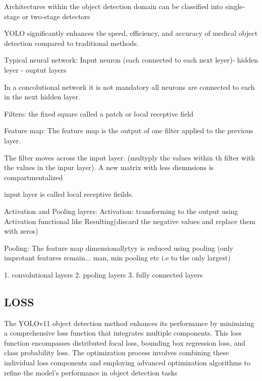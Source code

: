 \documentclass[a4paper,10pt,twocolumn]{article}
\numberwithin{figure}{section}
\numberwithin{table}{section}
\begin{document}
Architectures within the object detection domain can be 
classified into single-stage or two-stage detectors

YOLO significantly enhances the speed, efficiency, and accuracy of medical object detection compared to traditional methods.

Typical neural network:
Input neuron (each connected to each next leyer)- hidden leyer - ouptut layers

In a concolutional network it is not mandatory all neurons are connected
to each in the next hidden layer. 

Filters: the fixed square called a patch or local receptive field

Feature map: The feature map is the output of one filter applied 
to the previous layer. 

The filter moves across the input layer. (multyply the values within th 
filter with the values in the inpur layer). A new matrix with less diemnsions is compartmentalized

input layer is called local receptive fieilds. 


Activation and Pooling layers:
Activation: transforming to the output using Activation functional like Resulting(discard the negative
values and replace them with zeros) 

Pooling: The feature map dimensionallytyy is reduced using pooling 
(only improtant features remain... man, min pooling etc i.e  to the only largest)

1. convolutional layers 
2. ppoling layers
3. fully connected layers

\subsection{\mbox{LOSS}}

The YOLOv11 object detection method enhances its performance by minimizing a comprehensive loss function that integrates multiple components. This loss function encompasses
distributed focal loss, bounding box regression loss, and class
probability loss. The optimization process involves combining
these individual loss components and employing advanced
optimization algorithms to refine the model’s performance
in object detection tasks
\end{document}
